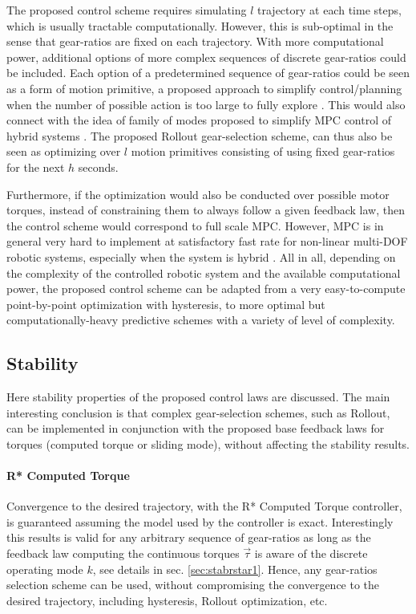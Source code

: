 The proposed control scheme requires simulating $l$ trajectory at each time steps, which is usually tractable computationally. However, this is sub-optimal in the sense that gear-ratios are fixed on each trajectory. With more computational power, additional options of more complex sequences of discrete gear-ratios could be included. Each option of a predetermined sequence of gear-ratios could be seen as a form of motion primitive, a proposed approach to simplify control/planning when the number of possible action is too large to fully explore \cite{gray_predictive_2012}. This would also connect with the idea of family of modes proposed to simplify MPC control of hybrid systems \cite{hogan_feedback_2016}. The proposed Rollout gear-selection scheme, can thus also be seen as optimizing over $l$ motion primitives consisting of using fixed gear-ratios for the next $h$ seconds. 

Furthermore, if the optimization would also be conducted over possible motor torques, instead of constraining them to always follow a given feedback law, then the control scheme would correspond to full scale MPC. However, MPC is in general very hard to implement at satisfactory fast rate for non-linear multi-DOF robotic systems, especially when the system is hybrid \cite{hogan_feedback_2016}. 
%
All in all, depending on the complexity of the controlled robotic system and the available computational power, the proposed control scheme can be adapted from a very easy-to-compute point-by-point optimization with hysteresis, to more optimal but computationally-heavy predictive schemes with a variety of level of complexity. 


\subsection{Stability}

Here stability properties of the proposed control laws are discussed. The main interesting conclusion is that complex gear-selection schemes, such as Rollout, can be implemented in conjunction with the proposed base feedback laws for torques (computed torque or sliding mode), without affecting the stability results. 

\paragraph{R* Computed Torque} Convergence to the desired trajectory, with the R* Computed Torque controller, is guaranteed assuming the model used by the controller is exact. Interestingly this results is valid for any arbitrary sequence of gear-ratios as long as the feedback law computing the continuous torques $\vec{\tau}$ is aware of the discrete operating mode $k$, see details in sec. \ref{sec:stabrstar1}. Hence, any gear-ratios selection scheme can be used, without compromising the convergence to the desired trajectory, including hysteresis, Rollout optimization, etc.

